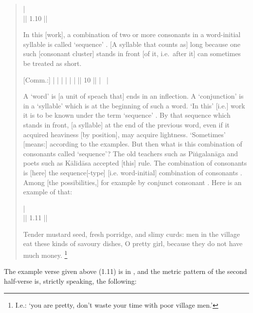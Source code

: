 \begin{quote}
 | \\
 || 1.10 ||

In this [work], a combination of two or more consonants
 in a word-initial syllable  is
called `sequence' . [A syllable that counts as] long because one
such [consonant cluster] stands in front [of it, i.e.\ after it] can 
sometimes be treated as short.

{\footnotesize [Comm.:] 
 | 
 |
 | 
 | 
 | 
 |
|| 10 || 
 | 
~|

A `word' is [a unit of speach that] ends in an inflection. 
A `conjunction' is in a `syllable' which is
at the beginning of such a word. 
`In this' [i.e.] work it is to be known under the 
term `sequence' . By that sequence which stands in front, 
[a syllable] at the end of the previous word, even if it acquired
heaviness [by position], may acquire lightness. `Sometimes' [means:]
according to the examples.
But then what is this combination of consonants called `sequence'?
The old teachers such as Piṅgalanāga and poets such as Kālidāsa
accepted [this] rule. The combination of consonants 
is [here] the sequence[-type]  [i.e. word-initial] 
combination of consonants .
Among [the possibilities,] for example by conjunct consonant 
.
Here is an example of that:}

 |\\
 || 1.11 ||

Tender mustard seed, fresh porridge, and slimy curds: men in the village eat
these kinds of savoury dishes, O pretty girl, because they do not have
much money.%
	\footnote{I.e.: `you are pretty, don't waste your time with poor village men.'}
\end{quote}

\noindent
The example verse given above (1.11) is in , and the
metric pattern of the second half-verse is, strictly speaking, the following:
 
